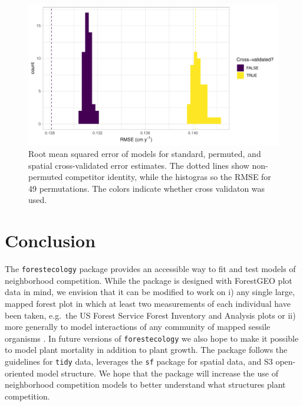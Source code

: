 \documentclass[12pt]{article}
\begin{document}
\begin{figure}

{\centering \includegraphics[width=1\linewidth]{simulation_results/2021-03-03_scbi_49_shuffles} 

}

\caption{Root mean squared error of models for standard, permuted, and spatial cross-validated error estimates. The dotted lines show non-permuted competitor identity, while the histogras so the RMSE for 49 permutations. The colors indicate whether cross validaton was used.}\label{fig:scbi-simulation}
\end{figure}

\hypertarget{conclusion}{%
\section{Conclusion}\label{conclusion}}

The \texttt{forestecology} package provides an accessible way to fit and
test models of neighborhood competition. While the package is designed
with ForestGEO plot data in mind, we envision that it can be modified to
work on i) any single large, mapped forest plot in which at least two
measurements of each individual have been taken, e.g.~the US Forest
Service Forest Inventory and Analysis plots or ii) more generally to
model interactions of any community of mapped sessile organisms
\citep{smith_forest_2002}. In future versions of \texttt{forestecology}
we also hope to make it possible to model plant mortality in addition to
plant growth. The package follows the guidelines for \texttt{tidy} data,
leverages the \texttt{sf} package for spatial data, and S3 open-oriented
model structure. We hope that the package will increase the use of
neighborhood competition models to better understand what structures
plant competition.
\end{document}
